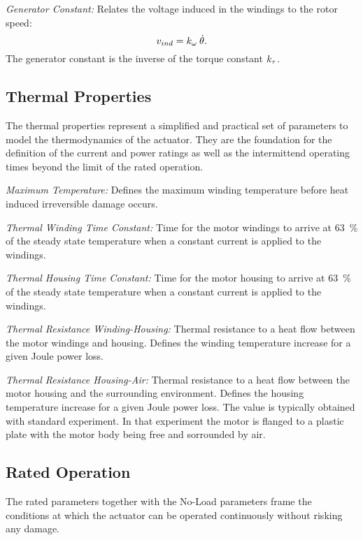 \documentclass[a4paper,10pt]{cjtdsheet}      %
\begin{document}
\begin{multicols}{2}
\emph{Generator Constant:} Relates the voltage induced in the windings to the rotor speed:
\begin{equation}
	v_{ind} = k_\omega \: \dot{\theta}.
\end{equation}
The generator constant is the inverse of the torque constant $k_\tau$.

%
%
\subsection*{Thermal Properties}
The thermal properties represent a simplified and practical set of parameters to model the thermodynamics of the actuator. They are the foundation for the definition of the current and power ratings as well as the intermittend operating times beyond the limit of the rated operation.

\emph{Maximum Temperature:} Defines the maximum winding temperature before heat induced irreversible damage occurs.

\emph{Thermal Winding Time Constant:} Time for the motor windings to arrive at 63~\% of the steady state temperature when a constant current is applied to the windings.

\emph{Thermal Housing Time Constant:} Time for the motor housing to arrive at 63~\% of the steady state temperature when a constant current is applied to the windings.

\emph{Thermal Resistance Winding-Housing:} Thermal resistance to a heat flow between the motor windings and housing. Defines the winding temperature increase for a given Joule power loss.

\emph{Thermal Resistance Housing-Air:} Thermal resistance to a heat flow between the motor housing and the surrounding environment. Defines the housing temperature increase for a given Joule power loss. The value is typically obtained with standard experiment. In that experiment the motor is flanged to a plastic plate with the motor body being free and sorrounded by air.

%
%
\subsection*{Rated Operation}
The rated parameters together with the No-Load parameters frame the conditions at which the actuator can be operated continuously without risking any damage.


\end{multicols}
\end{document}
